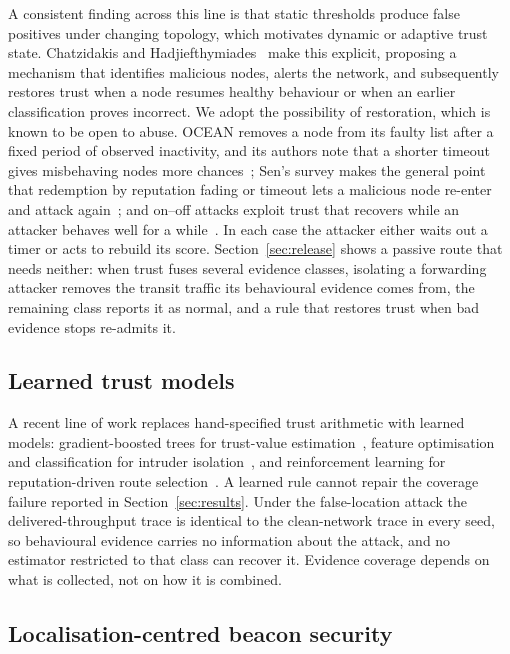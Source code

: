 \documentclass[pdflatex,sn-mathphys-num]{sn-jnl}%
\theoremstyle{thmstyleone}%
\theoremstyle{thmstyletwo}%
\theoremstyle{thmstylethree}%
\begin{document}
A consistent finding across this line is that static thresholds produce
false positives under changing topology, which motivates dynamic or adaptive
trust state. Chatzidakis and Hadjiefthymiades~\cite{chatzidakis2022trust}
make this explicit, proposing a mechanism that identifies malicious nodes,
alerts the network, and subsequently restores trust when a node resumes
healthy behaviour or when an earlier classification proves incorrect. We
adopt the possibility of restoration, which is known to be open to abuse.
OCEAN removes a node from its faulty list after a fixed period of
observed inactivity, and its authors note that a shorter timeout gives
misbehaving nodes more chances~\cite{bansal2003ocean}; Sen's survey makes the
general point that redemption by reputation fading or timeout lets a
malicious node re-enter and attack again~\cite{sen2010survey}; and on--off
attacks exploit trust that recovers while an attacker behaves well for a
while~\cite{sun2006attacks}. In each case the attacker either waits out a
timer or acts to rebuild its score. Section~\ref{sec:release} shows a
passive route that needs neither: when trust fuses several evidence
classes, isolating a forwarding attacker removes the transit traffic its
behavioural evidence comes from, the remaining class reports it as normal,
and a rule that restores trust when bad evidence stops re-admits it.

\subsection{Learned trust models}

A recent line of work replaces hand-specified trust arithmetic with learned
models: gradient-boosted trees for trust-value estimation~\cite{dhand2025secure},
feature optimisation and classification for intruder
isolation~\cite{kavitha2019india}, and reinforcement learning for
reputation-driven route selection~\cite{ryu2023reputation}. A learned rule
cannot repair the coverage failure reported in Section~\ref{sec:results}.
Under the false-location attack the delivered-throughput trace is identical to
the clean-network trace in every seed, so behavioural evidence carries no
information about the attack, and no estimator restricted to that class can
recover it. Evidence coverage depends on what is collected, not on how it is
combined.

\subsection{Localisation-centred beacon security}
\end{document}
